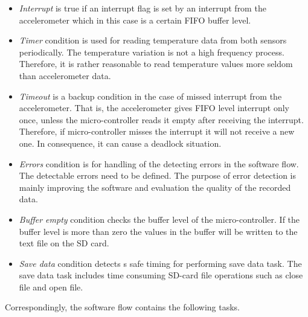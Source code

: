 \documentclass[english,12pt,a4paper,pdftex,elec,utf8]{aaltothesis}
\begin{document}
\begin{itemize}
\item \textit{Interrupt} is true if an interrupt flag is set by an interrupt from the accelerometer which in this case is a certain FIFO buffer level.

\item \textit{Timer} condition is used for reading temperature data from both sensors periodically. The temperature variation is not a high frequency process. Therefore, it is rather reasonable to read temperature values more seldom than accelerometer data.

\item \textit{Timeout} is a backup condition in the case of missed interrupt from the accelerometer. That is, the accelerometer gives FIFO level interrupt only once, unless the micro-controller reads it empty after receiving the interrupt. Therefore, if micro-controller misses the interrupt it will not receive a new one. In consequence, it can cause a deadlock situation.

\item \textit{Errors} condition is for handling of the detecting errors in the software flow. The detectable errors need to be defined. The purpose of error detection is mainly improving the software and evaluation the quality of the recorded data.

\item \textit{Buffer empty} condition checks the buffer level of the micro-controller. If the buffer level is more than zero the values in the buffer will be written to the text file on the SD card.

\item \textit{Save data} condition detects s safe timing for performing save data task. The save data task includes time consuming SD-card file operations such as close file and open file.

\end{itemize}
Correspondingly, the software flow contains the following tasks.
\end{document}
